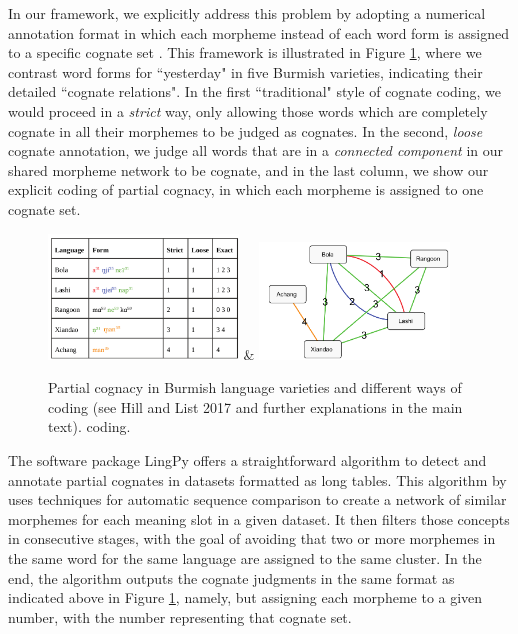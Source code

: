 \documentclass[xetex,svgnames]{scrartcl}
\begin{document}
In our framework, we explicitly address this problem by adopting a numerical annotation format in
which each morpheme instead of each word form is assigned to a specific cognate set
\citep{Hill2017a}. This framework is illustrated in Figure \ref{fig:pcogs}, where we contrast word
forms for ``yesterday" in five Burmish varieties, indicating their detailed ``cognate relations".
In the first ``traditional" style of cognate coding, we would proceed in a \emph{strict} way, only
allowing those words which are completely cognate in all their morphemes to be judged as cognates.
In the second, \emph{loose} cognate annotation, we judge all words that are in a \emph{connected
component} in our shared morpheme network to be cognate, and in the last column, we show our
explicit coding of partial cognacy, in which each morpheme is assigned to one cognate set.

\begin{figure}[htb]
  \centering
  \includegraphics[width=0.45\textwidth]{pcogs-1.png} &
  \includegraphics[width=0.45\textwidth]{pcogs-2.png} \\\endtabular
  \caption{Partial cognacy in Burmish language varieties and different ways of coding (see Hill and
  List 2017 and further explanations in the main text).
  coding.}
  \label{fig:pcogs}
\end{figure}

The software package LingPy offers a straightforward algorithm to detect and annotate partial
cognates in datasets formatted as long tables. This algorithm by \citet{List2016g} uses techniques for automatic sequence
comparison to create a network of similar morphemes for each meaning slot in a given dataset. It
then filters those concepts in consecutive stages, with the goal of avoiding that two or more
morphemes in the same word for the same language are assigned to the same cluster. In the end, the
algorithm outputs the cognate judgments in the same format as indicated above in Figure
\ref{fig:pcogs}, namely, but assigning each morpheme to a given number, with the number representing
that cognate set.
\end{document}
